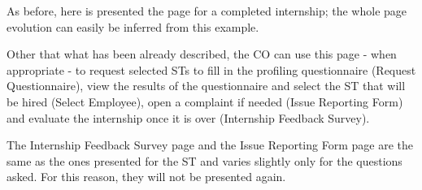 \par As before, here is presented the page for a completed internship; the whole page evolution can easily be inferred
from this example.

\par Other that what has been already described, the CO can use this page - when appropriate - to request selected
STs to fill in the profiling questionnaire (Request Questionnaire), view the results of the questionnaire and select
the ST that will be hired (Select Employee), open a complaint if needed (Issue Reporting Form) and evaluate the
internship once it is over (Internship Feedback Survey).

\par The Internship Feedback Survey page and the Issue Reporting Form page are the same as the ones presented for the
ST and varies slightly only for the questions asked. For this reason, they will not be presented again.
